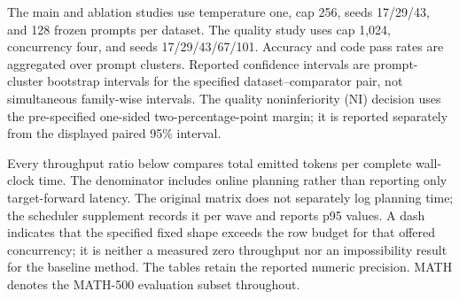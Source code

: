 \documentclass{article}
\begin{document}
The main and ablation studies use temperature one, cap 256, seeds 17/29/43, and 128 frozen prompts per dataset. The quality study uses cap 1,024, concurrency four, and seeds 17/29/43/67/101. Accuracy and code pass rates are aggregated over prompt clusters. Reported confidence intervals are prompt-cluster bootstrap intervals for the specified dataset--comparator pair, not simultaneous family-wise intervals. The quality noninferiority (NI) decision uses the pre-specified one-sided two-percentage-point margin; it is reported separately from the displayed paired 95\% interval.

Every throughput ratio below compares total emitted tokens per complete wall-clock time. The denominator includes online planning rather than reporting only target-forward latency. The original matrix does not separately log planning time; the scheduler supplement records it per wave and reports p95 values. A dash indicates that the specified fixed shape exceeds the row budget for that offered concurrency; it is neither a measured zero throughput nor an impossibility result for the baseline method. The tables retain the reported numeric precision. MATH denotes the MATH-500 evaluation subset throughout.
\end{document}
